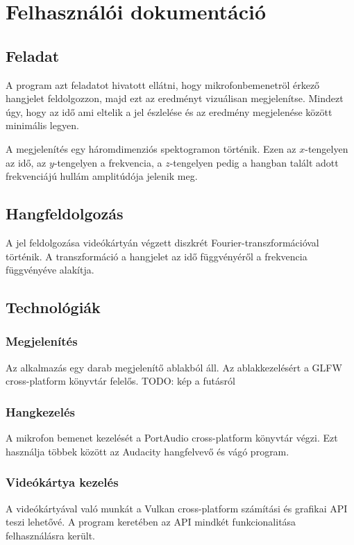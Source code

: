 
\section{Felhaszn\'al\'oi dokument\'aci\'o}
\subsection{Feladat}
A program azt feladatot hivatott ell\'atni, hogy mikrofonbemenetr\"ol \'erkez\H o hangjelet feldolgozzon, majd ezt az eredm\'enyt vizu\'alisan megjelen\'itse. Mindezt \'ugy, hogy az id\H o ami eltelik a jel \'eszlel\'ese \'es az eredm\'eny megjelen\'ese k\"oz\"ott minim\'alis legyen.

A megjelen\'it\'es egy h\'aromdimenzi\'os spektogramon t\"ort\'enik. Ezen az $x$-tengelyen az id\H o, az $y$-tengelyen a frekvencia, a $z$-tengelyen pedig a hangban tal\'alt adott frekvenci\'aj\'u hull\'am amplit\'ud\'oja jelenik meg.

\subsection{Hangfeldolgoz\'as}
A jel feldolgoz\'asa vide\'ok\'arty\'an v\'egzett diszkr\'et Fourier-transzform\'aci\'oval t\"ort\'enik. A transzform\'aci\'o a hangjelet az id\H o f\"uggv\'eny\'er\H ol a frekvencia f\"uggv\'eny\'eve alak\'itja. 


\subsection{Technol\'ogi\'ak}
\subsubsection{Megjelen\'it\'es}
Az alkalmaz\'as egy darab megjelen\'it\H o ablakb\'ol \'all. Az ablakkezel\'es\'ert a GLFW cross-platform k\"onyvt\'ar felel\H os.
TODO: k\'ep a fut\'asr\'ol

\subsubsection{Hangkezel\'es}
A mikrofon bemenet kezel\'es\'et a PortAudio cross-platform k\"onyvt\'ar v\'egzi. Ezt haszn\'alja t\"obbek k\"oz\"ott az Audacity hangfelvev\H o \'es v\'ag\'o program.

\subsubsection{Vide\'ok\'artya kezel\'es}
A vide\'ok\'arty\'aval val\'o munk\'at a Vulkan cross-platform sz\'am\'it\'asi \'es grafikai API teszi lehet\H ov\'e. A program keret\'eben az API mindk\'et funkcionalit\'asa felhaszn\'al\'asra ker\"ult.

